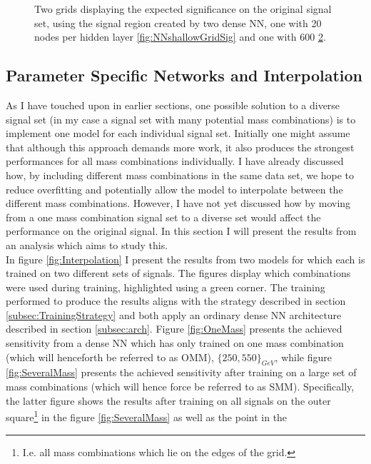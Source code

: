 \begin{figure}
{\begin{subfigure}{.6\textwidth}
        \vspace{-1.cm}
        \caption{}
        \label{fig:NNGridSig}
    \end{subfigure}
    }
    \caption{Two grids displaying the expected significance on the original signal set, using the signal region 
    created by two dense \acs{NN}, one with 20 nodes per hidden layer \ref{fig:NNshallowGridSig} and one with 600 \ref{fig:NNGridSig}.}
\end{figure}
\subsection{Parameter Specific Networks and Interpolation}
As I have touched upon in earlier sections, one possible solution to a diverse signal set (in my case a signal set with many 
potential mass combinations) is to implement one model for each individual signal set. Initially one might assume that although 
this approach demands more work, it also produces the strongest performances for all mass combinations individually. I have already 
discussed how, by including different mass combinations in the same data set, we hope to reduce overfitting and potentially allow 
the model to interpolate between the different mass combinations. However, I have not yet discussed how by moving from a one 
mass combination signal set to a diverse set would affect the performance on the original signal. In this section I will present the 
results from an analysis which aims to study this.
\\
In figure \ref{fig:Interpolation} I present the results from two models for which each is trained on two different sets of signals.
The figures display which combinations were used during training, highlighted using a green corner. 
The training performed to produce the results aligns with the strategy described in section \ref{subsec:TrainingStrategy} and both apply
an ordinary dense \ac{NN} architecture described in section \ref{subsec:arch}. Figure \ref{fig:OneMass} presents the achieved sensitivity 
from a dense \ac{NN} which has only trained on one mass combination (which will henceforth be referred to as \ac{OMM}), $\{250,550\}_{GeV}$, 
while figure \ref{fig:SeveralMass} presents the achieved sensitivity after training on a large set of mass combinations 
(which will hence force be referred to as \ac{SMM}). Specifically, the latter figure shows the results after training on all signals on the outer 
square\footnote{I.e. all mass combinations which lie on the edges of the grid.} in the figure \ref{fig:SeveralMass} as well as the point in the 
